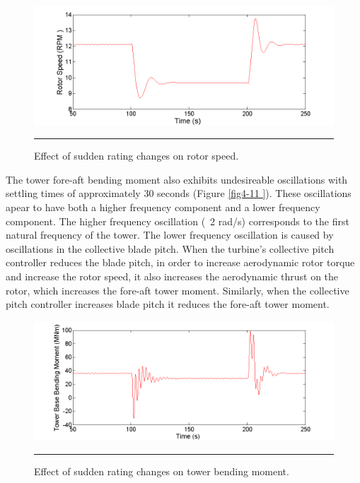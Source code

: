 \begin{figure}[htbp]
	\centering
		\includegraphics[trim = {1cm 0 2cm 0}, clip, width = \linewidth]{Figures/ch4Figures/fig4-10.png}
		\rule{35em}{0.5pt}
	\caption{Effect of sudden rating changes on rotor speed.}
	\label{fig4-10}
\end{figure}

The tower fore-aft bending moment also exhibits undesireable oscillations with settling times of approximately 30 seconds (Figure \ref{fig4-11 }). These oscillations apear to have both a higher frequency component and a lower frequency component. The higher frequency oscillation (~2 rad/s) corresponds to the first natural frequency of the tower. The lower frequency oscillation is caused by oscillations in the collective blade pitch. When the turbine's collective pitch controller reduces the blade pitch, in order to increase aerodynamic rotor torque and increase the rotor speed, it also increases the aerodynamic thrust on the rotor, which increases the fore-aft tower moment. Similarly, when the collective pitch controller increases blade pitch it reduces the fore-aft tower moment. 

\begin{figure}[htbp]
	\centering
		\includegraphics[trim = {1cm 0 2cm 0}, clip, width = \linewidth]{Figures/ch4Figures/fig4-11.png}
		\rule{35em}{0.5pt}
	\caption{Effect of sudden rating changes on tower bending moment.}
	\label{fig4-11}
\end{figure}

